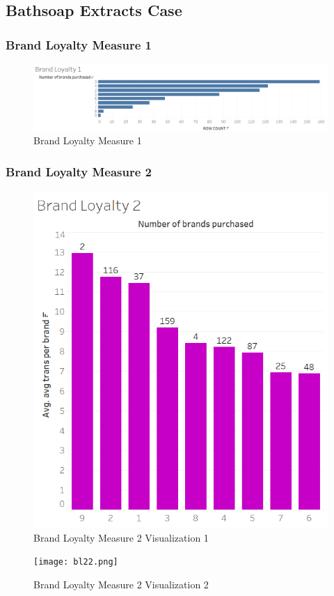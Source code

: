 \documentclass[11pt]{article}
\begin{document}
\subsection{Bathsoap Extracts Case}
\subsubsection{Brand Loyalty Measure 1}
\begin{figure}[H]
    \centering
    \includegraphics[width=1\columnwidth]{pics/bl1.png}
    \caption{Brand Loyalty Measure 1}
    \label{lr}
\end{figure}

\subsubsection{Brand Loyalty Measure 2}
\begin{figure}[H]
    \centering
    \includegraphics[width=0.65\columnwidth]{pics/bl2.png}
    \caption{Brand Loyalty Measure 2 Visualization 1}
    \label{lr}
\end{figure}

\begin{figure}[H]
    \centering
    \texttt{[image: bl22.png]}
    \caption{Brand Loyalty Measure 2 Visualization 2}
    \label{lr}
\end{figure}
\end{document}
